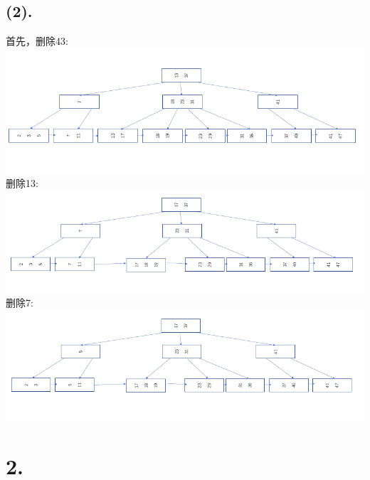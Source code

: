 \documentclass{article}
\begin{document}
	\subsection*{(2).}
	首先，删除43: \\
	\includegraphics[scale=0.48]{5.png}\\
	删除13: \\
	\includegraphics[scale=0.48]{6.png}\\
	删除7: \\
	\includegraphics[scale=0.48]{7.png}\\
	\section*{2.}
\end{document}
